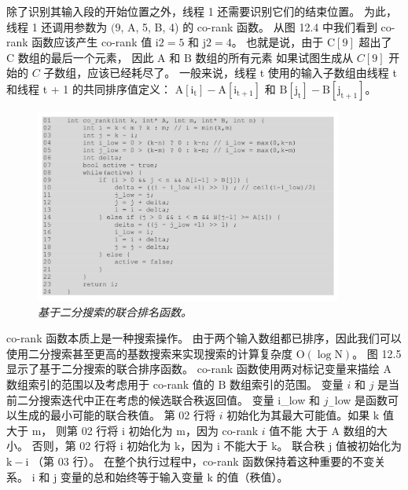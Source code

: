 除了识别其输入段的开始位置之外，线程 1 还需要识别它们的结束位置。 
为此，线程 1 还调用参数为 $(9$, A, 5, B, 4) 的 co-rank 函数。 
从图 12.4 中我们看到 co-rank 函数应该产生 co-rank 值 $\mathrm{i} 2=5$ 和 $\mathrm{j} 2=4$。 
也就是说，由于 $\mathrm{C}[9]$ 超出了 $\mathrm{C}$ 数组的最后一个元素，
因此 $\mathrm{A}$ 和 $\mathrm{B}$ 数组的所有元素 如果试图生成从 $C[9]$ 开始的 $C$ 子数组，应该已经耗尽了。 
一般来说，线程 t 使用的输入子数组由线程 t 和线程 t + 1 的共同排序值定义：
$\mathrm{A}\left[ \mathrm{i}_{\mathrm{t}}\right]-\mathrm{A}\left[\mathrm{i}_{\mathrm{t}+1}\right]$ 
和 $\mathrm{B }\left[\mathrm{j}_{\mathrm{t}}\right]-\mathrm{B}\left[\mathrm{j}_{\mathrm{t}+1}\right]$。

\begin{figure}[H]
	\centering
	\includegraphics[width=0.9\textwidth]{figs/F12.5.png}
	\caption{\textit{基于二分搜索的联合排名函数。}}
\end{figure}

co-rank 函数本质上是一种搜索操作。 
由于两个输入数组都已排序，因此我们可以使用二分搜索甚至更高的基数搜索来实现搜索的计算复杂度 $\mathrm{O}(\log \mathrm{N})$。 图 12.5 显示了基于二分搜索的联合排序函数。 
co-rank 函数使用两对标记变量来描绘 $\mathrm{A}$ 数组索引的范围以及考虑用于 co-rank 值的 $\mathrm{B}$ 数组索引的范围。 变量 $i$ 和 $j$ 是当前二分搜索迭代中正在考虑的候选联合秩返回值。 
变量 i\_low 和 $j_{-}$low 是函数可以生成的最小可能的联合秩值。 
第 02 行将 $i$ 初始化为其最大可能值。如果 $\mathrm{k}$ 值大于 $\mathrm{m}$，
则第 02 行将 $\mathrm{i}$ 初始化为 $\mathrm{m}$，因为 co-rank $i$ 值不能 大于 A 数组的大小。 
否则，第 02 行将 $\mathrm{i}$ 初始化为 $\mathrm{k}$，因为 $\mathrm{i}$ 不能大于 $\mathrm{k}$。 
联合秩 $\mathrm{j}$ 值被初始化为 $\mathrm{k}-\mathrm{i}$ （第 03 行）。 
在整个执行过程中，co-rank 函数保持着这种重要的不变关系。 
$\mathrm{i}$ 和 $\mathrm{j}$ 变量的总和始终等于输入变量 $\mathrm{k}$ 的值（秩值）。

